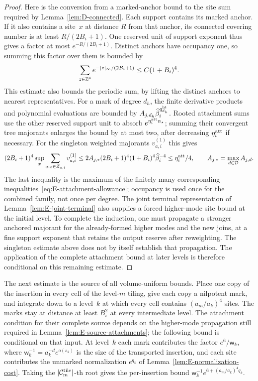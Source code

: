 \begin{proof}
Here is the conversion from a marked-anchor bound to the site sum required by Lemma~\ref{lem:D-connected}. Each support contains its marked anchor. If it also contains a site~$x$ at distance $R$ from that anchor, its connected covering number is at least $R/(2B_i+1)$. One reserved unit of support exponent thus gives a factor at most $e^{-R/(2B_i+1)}$. Distinct anchors have occupancy one, so summing this factor over them is bounded by
\begin{equation*}
 \sum_{z\in\mathbb{Z}^4}e^{-|z|_\infty/(2B_i+1)}\le C(1+B_i)^4.
\end{equation*}
This estimate also bounds the periodic sum, by lifting the distinct anchors to nearest representatives. For a mark of degree $d_h$, the finite derivative products and polynomial evaluations are bounded by $A_{j,d_h}\widehat\beta_i^{q^{\rm ht}_{d_h}}$. Rooted attachment sums use the other reserved support unit to absorb $e^{\eta^{\rm att}_in_\star}$; summing their convergent tree majorants enlarges the bound by at most two, after decreasing $\eta^{\rm att}_i$ if necessary. For the singleton weighted majorants $v_{a,i}^{(1)}$ this gives
\begin{equation*}
 (2B_i+1)^4\sup_x\sum_{a:x\in Z_{a,i}}v_{a,i}^{(1)}
 \le2A_{j,*}(2B_i+1)^4(1+B_i)^4\widehat\beta_i^{-4}\le\eta^{\rm att}_i/4,
\qquad A_{j,*}=\max_{d\in\mathcal D}A_{j,d}.
\end{equation*}
The last inequality is the maximum of the finitely many corresponding
inequalities~\eqref{eq:E-attachment-allowance}; occupancy is used once
for the combined family, not once per degree. The joint terminal
representation of Lemma~\ref{lem:E-joint-terminal} also supplies a
forced higher-mode site bound at the initial level. To complete the
induction, one must propagate a stronger anchored majorant for the
already-formed higher modes and the new joins, at a fine support
exponent that retains the output reserve after reweighting. The
singleton estimate above does not by itself establish that propagation.
The application of the complete attachment bound at later levels is
therefore conditional on this remaining estimate.
\end{proof}

The next estimate is the source of all volume-uniform bounds. Place one copy of the insertion in every cell of the level-$m$ tiling, give each copy a nilpotent mark, and integrate down to a level~$k$ at which every cell contains $(a_m/a_k)^4$ sites. The marks stay at distance at least $B_i^2$ at every intermediate level. The attachment condition for their complete source depends on the higher-mode propagation still required in Lemma~\ref{lem:E-source-attachments}; the following bound is conditional on that input. At level~$k$ each mark contributes the factor $e^6/\mathsf w_k$, where $\mathsf w_k^{-1}=a_k^{-d}e^{o(s_k)}$ is the size of the transported insertion, and each site contributes the unmarked normalization $e^{q_k}$ of Lemma~\ref{lem:E-normalization-cost}. Taking the $|\mathcal C^{\rm tile}_m|$-th root gives the per-insertion bound $\mathsf w_k^{-1}e^{6+(a_m/a_k)^4q_k}$.

